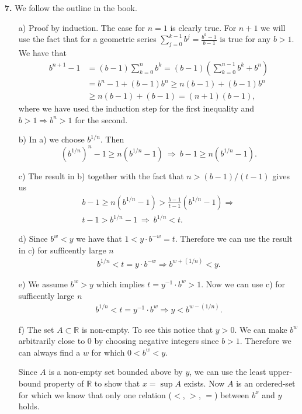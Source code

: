 \documentclass[11pt]{article}
\begin{document}
\noindent\textbf{7.} We follow the outline in the book.
\begin{itemize}
\item [a)] Proof by induction.
  The case for $n=1$ is clearly true.
  For $n+1$ we will use the fact that for a geometric series $\sum_{j=0}^{k-1} b^j = \frac{b^k-1}{b-1}$ is true for any $b>1$.
  We have that
  \begin{align*}
    b^{n+1}-1 &= (b-1)\sum_{k=0}^n b^k = (b-1)\left(\sum_{k=0}^{n-1} b^k + b^n\right)\\
              &= b^n - 1 + (b-1)b^n \geq n(b-1) + (b-1)b^n\\
              &\geq n(b-1) + (b-1) = (n+1)(b-1),
  \end{align*}
  where we have used the induction step for the first inequality and $b>1 \Rightarrow b^n > 1$ for the second.
\item [b)] In a) we choose $b^{1/n}$.
  Then
  \begin{displaymath}
    (b^{1/n})^n - 1 \geq n(b^{1/n}-1)\ \Rightarrow\ b-1 \geq n(b^{1/n}-1).
  \end{displaymath}
\item [c)] The result in b) together with the fact that $n > (b-1)/(t-1)$ gives us
  \begin{align*}
    b-1 \geq n(b^{1/n} - 1) > \frac{b-1}{t-1}(b^{1/n} - 1) \Rightarrow\\
    t - 1 > b^{1/n} - 1\ \Rightarrow\ b^{1/n} < t.
  \end{align*}
\item [d)] Since $b^w < y$ we have that $1 < y\cdot b^{-w} = t$.
  Therefore we can use the result in c) for sufficently large $n$
  \begin{align*}
    b^{1/n} < t = y\cdot b^{-w} \Rightarrow b^{w + (1/n)} < y.
  \end{align*}
\item [e)] We assume $b^w > y$ which implies $t = y^{-1}\cdot b^w > 1$.
  Now we can use c) for sufficently large $n$
  \begin{align*}
    b^{1/n} < t = y^{-1}\cdot b^w \Rightarrow y < b^{w - (1/n)}.
  \end{align*}

\item [f)] The set $A\subset \mathbb{R}$ is non-empty.
  To see this notice that $y>0$.
  We can make $b^w$ arbitrarily close to $0$ by choosing negative integers since $b>1$.
  Therefore we can always find a $w$ for which $0 < b^w < y$.

  Since $A$ is a non-empty set bounded above by $y$,
  we can use the least upper-bound property of $\mathbb{R}$ to show that $x=\sup{A}$ exists.
  Now $A$ is an ordered-set for which we know that only one relation ($<$, $>$, $=$) between $b^x$ and $y$ holds.


\end{itemize}
\end{document}

